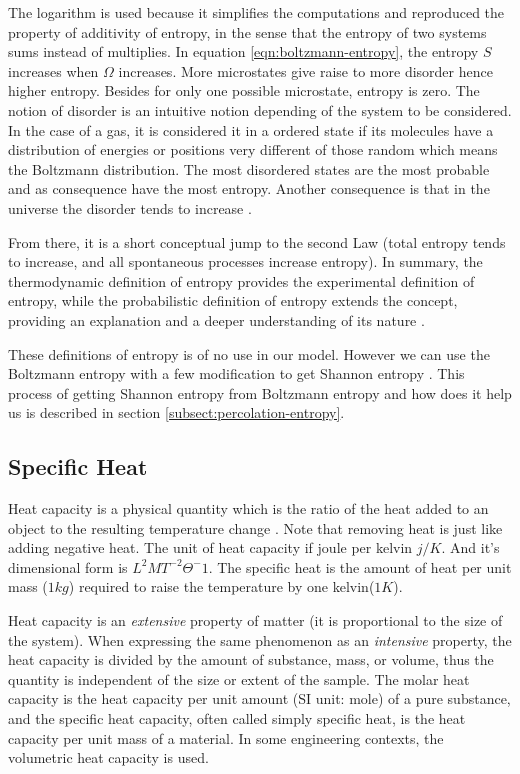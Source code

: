 		
		The logarithm is used because it simplifies the computations and reproduced the property of additivity of entropy, in the sense that the entropy of two systems sums instead of multiplies. In	equation \ref{eqn:boltzmann-entropy}, the entropy $S$ increases when $\Omega$ increases. More microstates give raise to more disorder	hence higher entropy. Besides for only one possible microstate, entropy is zero. The notion of	disorder is an intuitive notion depending of the system to be considered. In the case of a gas, it	is considered it in a ordered state if its molecules have a distribution of energies or positions very	
		different of those random which means the Boltzmann distribution. The most disordered states are	the most probable and as consequence have the most entropy. Another consequence is that in the	universe the disorder tends to increase \cite{Balibrea2016}.
		
		
		From there, it is a short conceptual jump to the second Law (total entropy tends to increase, and	all spontaneous processes increase entropy). In summary, the thermodynamic definition of entropy provides the experimental definition of entropy, while the probabilistic definition of entropy	extends the concept, providing an explanation and a deeper understanding of its nature \cite{Alam2016}.
		
		These definitions of entropy is of no use in our model. However we can use the Boltzmann entropy with a few modification to get Shannon entropy \cite{shanon_entropy}. This process of getting Shannon entropy from Boltzmann entropy and how does it help us is described in section \ref{subsect:percolation-entropy}.

	
	\subsection{Specific Heat}
	Heat capacity is a physical quantity which is the ratio of the heat added to an object to the resulting temperature change \cite{Walker2013}. Note that removing heat is just like adding negative heat. The unit of heat capacity if joule per kelvin $j/K$. And it's dimensional form is $L^2MT^{-2}\Theta^-1$.	The specific heat is the amount of heat per unit mass ($1kg$) required to raise the temperature by one kelvin($1K$). 
	
	
	Heat capacity is an \textit{extensive} property of matter (it is proportional to the size of the system). When expressing the same phenomenon as an \textit{intensive} property, the heat capacity is divided by the amount of substance, mass, or volume, thus the quantity is independent of the size or extent of the sample. The molar heat capacity is the heat capacity per unit amount (SI unit: mole) of a pure substance, and the specific heat capacity, often called simply specific heat, is the heat capacity per unit mass of a material. In some engineering contexts, the volumetric heat capacity is used.
	
